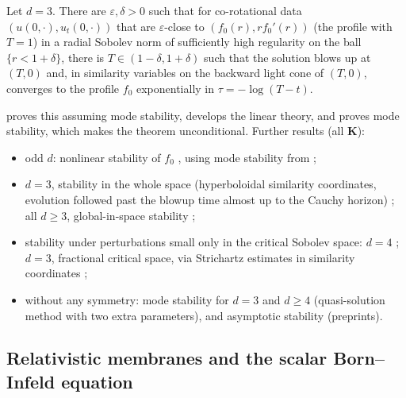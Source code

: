\begin{theorem}\label{geom:thm:d3}
Let $d=3$. There are $\varepsilon,\delta>0$ such that for co-rotational data
$(u(0,\cdot),u_t(0,\cdot))$ that are $\varepsilon$-close to
$(f_0(r),rf_0'(r))$ (the profile with $T=1$) in a radial Sobolev norm of
sufficiently high regularity on the ball $\{r<1+\delta\}$, there is
$T\in(1-\delta,1+\delta)$ such that the solution blows up at $(T,0)$ and,
in similarity variables on the backward light cone of $(T,0)$, converges to
the profile $f_0$ exponentially in $\tau=-\log(T-t)$.
\end{theorem}
\cite{Donninger2011} proves this assuming mode stability,
\cite{DonningerSchoerkhuberAichelburg2012} develops the linear theory, and
\cite{CostinDonningerXia2016} proves mode stability, which makes the theorem
unconditional. Further results (all \textbf{K}):
\begin{itemize}[leftmargin=*,itemsep=1pt]
\item odd $d$: nonlinear stability of $f_0$
  \cite{ChatzikaleasDonningerGlogic2017}, using mode stability from
  \cite{CostinDonningerGlogic2017};
\item $d=3$, stability in the whole space (hyperboloidal similarity
  coordinates, evolution followed past the blowup time almost up to the
  Cauchy horizon) \cite{BiernatDonningerSchoerkhuber2021}; all $d\ge3$,
  global-in-space stability \cite{Glogic2025};
\item stability under perturbations small only in the critical Sobolev
  space: $d=4$ \cite{DonningerWallauch2023}; $d=3$, fractional critical space,
  via Strichartz estimates in similarity coordinates
  \cite{DonningerWallauch2025};
\item without any symmetry: mode stability for $d=3$
  \cite{WeissenbacherKochDonninger2025} and $d\ge4$
  \cite{DonningerMoscatelli2026a} (quasi-solution method with two extra
  parameters), and asymptotic stability \cite{DonningerMoscatelli2026b}
  (preprints). %
\end{itemize}

\subsection{Relativistic membranes and the scalar Born--Infeld equation}
\label{geom:sec:membranes}

